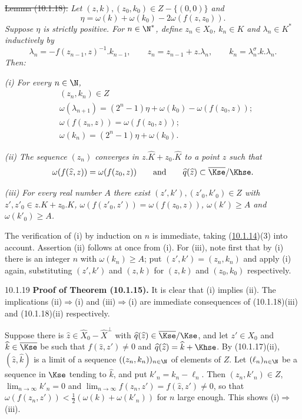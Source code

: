 \documentclass[12pt,a4paper,oneside,english]{smfart}
\makeatletter
\newcommand{\btanchor}[1]{\leavevmode\Hy@raisedlink{\hypertarget{bt:#1}{}}}
\newcommand{\btref}[1]{\hyperlink{bt:#1}{#1}}
\theoremstyle{definition}
\theoremstyle{bt}
\makeatother
\begin{document}
\st{Lemma (10.1.18).}
\emph{Let $(z,k),(z_0,k_0)\in Z-\{(0,0)\}$ and}
\[
\eta=\omega(k)+\omega(k_0)-2\omega(f(z,z_0)).
\]
\emph{Suppose $\eta$ is strictly positive. For $n\in\N^{*}$, define
$z_n\in X_0$, $k_n\in K$ and $\lambda_n\in K^{*}$ inductively by}
\[
\lambda_n=-f(z_{n-1},z)^{-1}.k_{n-1},\qquad
z_n=z_{n-1}+z.\lambda_n,\qquad k_n=\lambda_n^{\sigma}.k.\lambda_n .
\]
\emph{Then:}

\emph{(i) For every $n\in\N$,}
\begin{align}
&(z_n,k_n)\in Z \tag{1}\\
&\omega(\lambda_{n+1})=(2^{n}-1)\eta+\omega(k_0)-\omega(f(z_0,z)); \tag{2}\\
&\omega(f(z_n,z))=\omega(f(z_0,z)); \tag{3}\\
&\omega(k_n)=(2^{n}-1)\eta+\omega(k_0). \tag{4}
\end{align}

\emph{(ii) The sequence $(z_n)$ converges in $z.\widehat K+z_0.\widehat K$ to a
point $\widehat z$ such that}
\[
\omega(f(\widehat z,z))=\omega(f(z_0,z))
\qquad\text{and}\qquad
\widehat q(\widehat z)\subset\overline{\Kse}/\Khse .
\]

\emph{(iii) For every real number $A$ there exist $(z',k'),(z'_0,k'_0)\in Z$
with $z',z'_0\in z.K+z_0.K$, $\omega(f(z'_0,z'))=\omega(f(z_0,z))$,
$\omega(k')\ge A$ and $\omega(k'_0)\ge A$.}

\pf The verification of (i) by induction on $n$ is immediate, taking
(\btref{10.1.14})(3) into account. Assertion (ii) follows at once from (i). For (iii),
note first that by (i) there is an integer $n$ with $\omega(k_n)\ge A$; put
$(z',k')=(z_n,k_n)$ and apply (i) again, substituting $(z',k')$ and $(z,k)$ for
$(z,k)$ and $(z_0,k_0)$ respectively.

\num{10.1.19}\btanchor{10.1.19} \textbf{Proof of Theorem (10.1.15).}
It is clear that (i) implies (ii). The implications (ii)$\Rightarrow$(i) and
(iii)$\Rightarrow$(i) are immediate consequences of (10.1.18)(iii) and
(10.1.18)(ii) respectively.

Suppose there is $\widehat z\in\widehat X_0-\widehat X^{\perp}$ with
$\widehat q(\widehat z)\in\overline{\Kse}/\Kse$, and let $z'\in X_0$ and
$\widehat k\in\overline{\Kse}$ be such that $f(\widehat z,z')\neq0$ and
$\widehat q(\widehat z)=\widehat k+\Khse$. By (10.1.17)(ii),
$(\widehat z,\widehat k)$ is a limit of a sequence $((z_n,k_n))_{n\in\N}$ of
elements of $Z$. Let $(\ell_n)_{n\in\N}$ be a sequence in $\Kse$ tending to
$\widehat k$, and put $k'_n=k_n-\ell_n$. Then $(z_n,k'_n)\in Z$,
$\lim_{n\to\infty}k'_n=0$ and
$\lim_{n\to\infty}f(z_n,z')=f(\widehat z,z')\neq0$, so that
$\omega(f(z_n,z'))<\tfrac12(\omega(k)+\omega(k'_n))$ for $n$ large enough. This
shows (i)$\Rightarrow$(iii).
\end{document}
